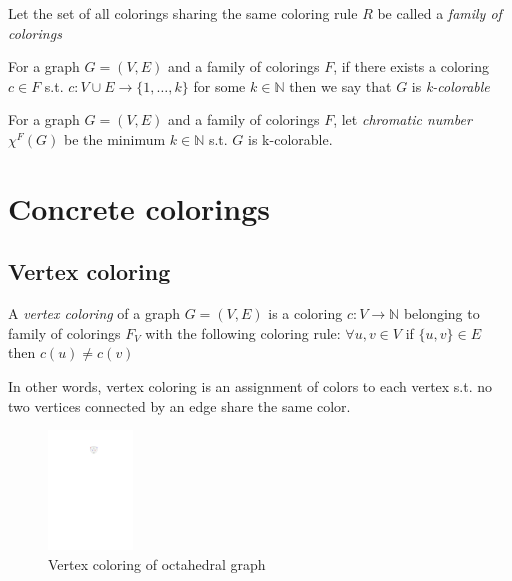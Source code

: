 \begin{definition}
    Let the set of all colorings sharing the same coloring rule $R$ be called a \textit{family of colorings}
\end{definition}

\begin{definition}
    For a graph $G=(V,E)$ and a family of colorings $F$, if there exists a coloring $c \in F$ s.t. $c: V \cup E \rightarrow \{1,\ldots,k\}$ for some $k \in \mathbb{N}$ then we say that $G$ is \textit{k-colorable}
\end{definition}

\begin{definition}
    For a graph $G=(V,E)$ and a family of colorings $F$, let \textit{chromatic number} $\chi ^F (G)$ be the minimum $k \in \mathbb{N}$ s.t. $G$ is k-colorable.
\end{definition}

\section{Concrete colorings}

\subsection{Vertex coloring}

\begin{definition}
    A \textit{vertex coloring} of a graph $G=(V,E)$ is a coloring $c : V \rightarrow \mathbb{N}$ belonging to family of colorings $F_V$ with the following coloring rule: $\forall u,v \in V$ if $\{u,v\} \in E$ then $c(u) \neq c(v)$ 
\end{definition}

In other words, vertex coloring is an assignment of colors to each vertex s.t. no two vertices connected by an edge share the same color.

\begin{figure}[H]
    \centering
    \includegraphics[width=0.2\textwidth]{../Resources/Figs/octahedral_vtx_colr.pdf}
    \caption{Vertex coloring of octahedral graph}
    \label{fig:octahedral_vtx_coloring}
\end{figure}

